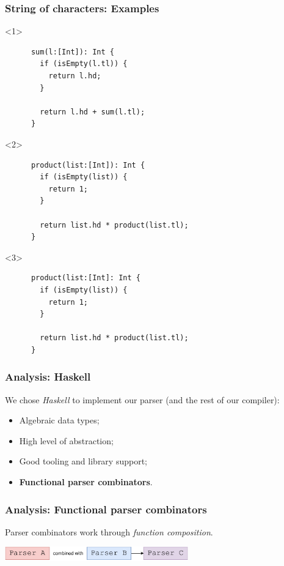 \documentclass{beamer}
\begin{document}
\begin{frame}[fragile]
  \frametitle{String of characters: Examples}

  \begin{onlyenv}<1>
    \begin{verbatim}
      sum(l:[Int]): Int {
        if (isEmpty(l.tl)) {
          return l.hd;
        }

        return l.hd + sum(l.tl);
      }
    \end{verbatim}
  \end{onlyenv}

  \begin{onlyenv}<2>
    \begin{verbatim}
      product(list:[Int]): Int {
        if (isEmpty(list)) {
          return 1;
        }

        return list.hd * product(list.tl);
      }
    \end{verbatim}
  \end{onlyenv}

  \begin{onlyenv}<3>
    \begin{verbatim}
      product(list:[Int]: Int {
        if (isEmpty(list)) {
          return 1;
        }

        return list.hd * product(list.tl);
      }
    \end{verbatim}
  \end{onlyenv}
\end{frame}


\begin{frame}
  \frametitle{Analysis: Haskell}

  We chose \textit{Haskell} to implement our parser (and the rest of our compiler):

  \begin{itemize}[<+->]
    \item Algebraic data types;
    \item High level of abstraction;
    \item Good tooling and library support;
    \item \textbf{Functional parser combinators}.
  \end{itemize}
\end{frame}

\begin{frame}
  \frametitle{Analysis: Functional parser combinators}

  Parser combinators work through \textit{function composition}.

  \begin{center}
    \includegraphics[width=300px]{figures/parser_combinator.pdf}
  \end{center}
\end{frame}
\end{document}
